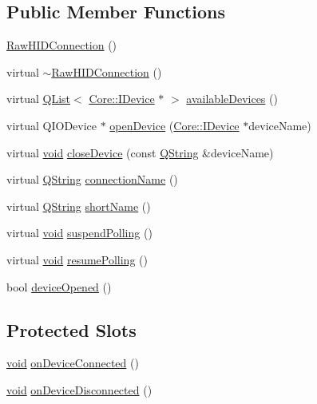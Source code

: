 \subsection*{Public Member Functions}
\begin{DoxyCompactItemize}
\item 
\hyperlink{group___raw_h_i_d_plugin_gaa6d75047d32946b3823a1cfe7b4d7328}{Raw\-H\-I\-D\-Connection} ()
\item 
virtual \hyperlink{group___raw_h_i_d_plugin_ga5d3dcc8e69d09013ff84a3412f1ccee7}{$\sim$\-Raw\-H\-I\-D\-Connection} ()
\item 
virtual \hyperlink{class_q_list}{Q\-List}$<$ \hyperlink{class_core_1_1_i_device}{Core\-::\-I\-Device} $\ast$ $>$ \hyperlink{group___raw_h_i_d_plugin_ga9a33750f32a6e48ba7463beaacf3696d}{available\-Devices} ()
\item 
virtual Q\-I\-O\-Device $\ast$ \hyperlink{group___raw_h_i_d_plugin_ga861af14dd75658d985780004160aefa2}{open\-Device} (\hyperlink{class_core_1_1_i_device}{Core\-::\-I\-Device} $\ast$device\-Name)
\item 
virtual \hyperlink{group___u_a_v_objects_plugin_ga444cf2ff3f0ecbe028adce838d373f5c}{void} \hyperlink{group___raw_h_i_d_plugin_ga80b9d6de6f0e054368bb3d920aa36de4}{close\-Device} (const \hyperlink{group___u_a_v_objects_plugin_gab9d252f49c333c94a72f97ce3105a32d}{Q\-String} \&device\-Name)
\item 
virtual \hyperlink{group___u_a_v_objects_plugin_gab9d252f49c333c94a72f97ce3105a32d}{Q\-String} \hyperlink{group___raw_h_i_d_plugin_ga753e060b5d2c26ebd344c084750bf715}{connection\-Name} ()
\item 
virtual \hyperlink{group___u_a_v_objects_plugin_gab9d252f49c333c94a72f97ce3105a32d}{Q\-String} \hyperlink{group___raw_h_i_d_plugin_gadf376fe560ac0b2e750fd4797139f602}{short\-Name} ()
\item 
virtual \hyperlink{group___u_a_v_objects_plugin_ga444cf2ff3f0ecbe028adce838d373f5c}{void} \hyperlink{group___raw_h_i_d_plugin_gac46703708a7e43cffa7712ebab818ba0}{suspend\-Polling} ()
\item 
virtual \hyperlink{group___u_a_v_objects_plugin_ga444cf2ff3f0ecbe028adce838d373f5c}{void} \hyperlink{group___raw_h_i_d_plugin_gabe7a095aa167ae8addf65d14e2dcc460}{resume\-Polling} ()
\item 
bool \hyperlink{group___raw_h_i_d_plugin_ga9bd370fd09da409d89f1dd7612d482cb}{device\-Opened} ()
\end{DoxyCompactItemize}
\subsection*{Protected Slots}
\begin{DoxyCompactItemize}
\item 
\hyperlink{group___u_a_v_objects_plugin_ga444cf2ff3f0ecbe028adce838d373f5c}{void} \hyperlink{group___raw_h_i_d_plugin_gae6fbe6bf878bf78034b81d648fd25edb}{on\-Device\-Connected} ()
\item 
\hyperlink{group___u_a_v_objects_plugin_ga444cf2ff3f0ecbe028adce838d373f5c}{void} \hyperlink{group___raw_h_i_d_plugin_gaf84655a7cf624587cf336b550e8c0045}{on\-Device\-Disconnected} ()
\end{DoxyCompactItemize}
